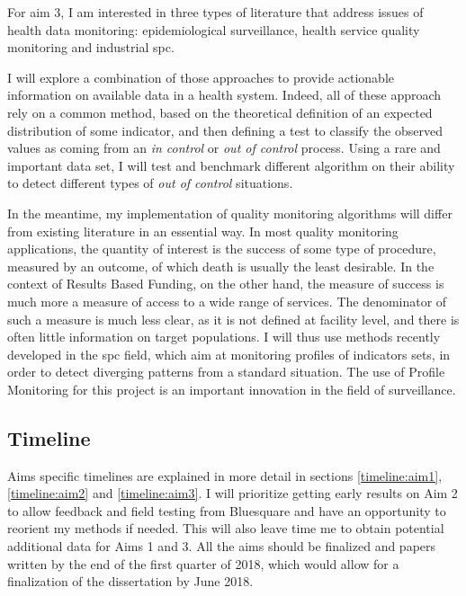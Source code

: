 For aim 3, I am interested in three types of literature that address issues of health data monitoring:
epidemiological surveillance, health service quality monitoring and industrial \gls{spc}.

I will explore a combination of those approaches to provide actionable information on available data in a health system. Indeed, all of these approach rely on a common method, based on the theoretical definition of an expected distribution of some indicator, and then defining a test to classify the observed values as coming from an \textit{in control} or \textit{out of control} process. Using a rare and important data set, I will test and benchmark different algorithm on their ability to detect different types of \textit{out of control} situations.

In the meantime, my implementation of  quality monitoring algorithms will differ from existing literature in an essential way. In most quality monitoring applications, the quantity of interest is the success of some type of procedure, measured by an outcome, of which death is usually the least desirable. In the context of Results Based Funding, on the other hand, the measure of success is much more a measure of access to a wide range of services. The denominator of such a measure is much less clear, as it is not defined at facility level, and there is often little information on target populations. I will thus use methods recently developed in the \gls{spc} field, which aim at monitoring profiles of indicators sets, in order to detect diverging patterns from a standard situation\citep{woodall_current_2014}.  The use of Profile Monitoring for this project is an important innovation in the field of surveillance.

\subsection{Timeline}

Aims specific timelines are explained in more detail in sections \ref{timeline:aim1}, \ref{timeline:aim2} and \ref{timeline:aim3}. I will prioritize getting early results on Aim 2 to allow feedback and field testing from Bluesquare and have an opportunity to reorient my methods if needed. This will also leave time me to obtain potential additional data for Aims 1 and 3. All the aims should be finalized and papers written by the end of the first quarter of 2018, which would allow for a finalization of the dissertation by June 2018.


